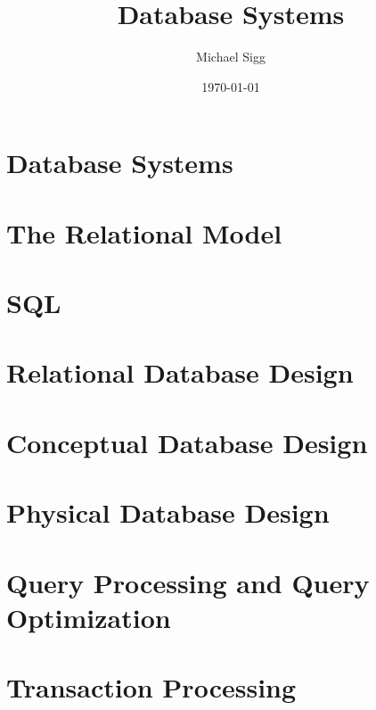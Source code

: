 \documentclass[11pt]{article}
\title{Database Systems}
\author{Michael Sigg}
\date{\today}
\begin{document}
\maketitle
\tableofcontents

\newpage

\section{Database Systems}


\section{The Relational Model}


\section{SQL}


\section{Relational Database Design}


\section{Conceptual Database Design}


\section{Physical Database Design}


\section{Query Processing and Query Optimization}


\section{Transaction Processing}

\end{document}
